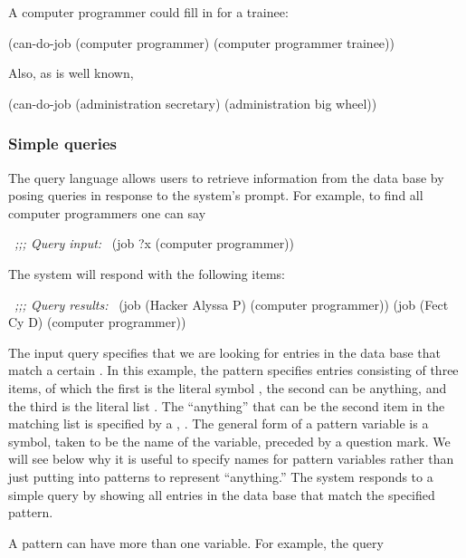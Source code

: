 \noindent
A computer programmer could fill in for a trainee:

\begin{codeBlock}
(can-do-job (computer programmer)
            (computer programmer trainee))
\end{codeBlock}

\noindent
Also, as is well known,

\begin{codeBlock}
(can-do-job (administration secretary)
            (administration big wheel))
\end{codeBlock}

\subsubsection*{Simple queries}

The query language allows users to retrieve information from the data base by
posing queries in response to the system's prompt.  For example, to find all
computer programmers one can say

\begin{codeBlock}
~\textit{;;; Query input:}~
(job ?x (computer programmer))
\end{codeBlock}

\noindent
The system will respond with the following items:

\begin{codeBlock}
~\textit{;;; Query results:}~
(job (Hacker Alyssa P) (computer programmer))
(job (Fect Cy D) (computer programmer))
\end{codeBlock}

\noindent
The input query specifies that we are looking for entries in the data base that
match a certain .  In this example, the pattern specifies
entries consisting of three items, of which the first is the literal symbol
, the second can be anything, and the third is the literal list
.  The ``anything'' that can be the second item in
the matching list is specified by a , .  The
general form of a pattern variable is a symbol, taken to be the name of the
variable, preceded by a question mark.  We will see below why it is useful to
specify names for pattern variables rather than just putting  into
patterns to represent ``anything.''  The system responds to a simple query by
showing all entries in the data base that match the specified pattern.

A pattern can have more than one variable.  For example, the query


